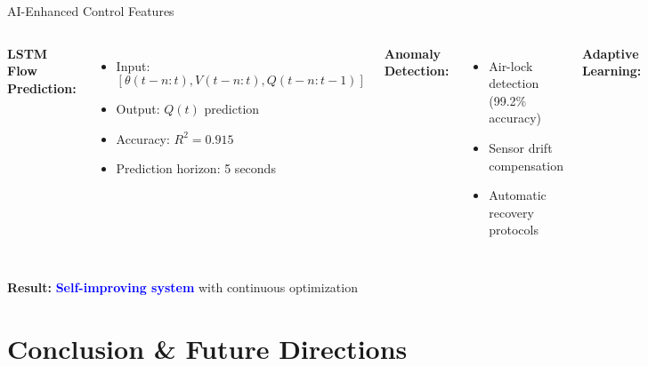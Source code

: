 \documentclass[aspectratio=169]{beamer}
\begin{document}
\begin{frame}{AI-Enhanced Control Features}
\begin{columns}[T]
\textbf{LSTM Flow Prediction:}
\begin{itemize}
    \item Input: $[\theta(t-n:t), V(t-n:t), Q(t-n:t-1)]$
    \item Output: $Q(t)$ prediction
    \item Accuracy: $R^2 = 0.915$
    \item Prediction horizon: 5 seconds
\end{itemize}

\textbf{Anomaly Detection:}
\begin{itemize}
    \item Air-lock detection (99.2\% accuracy)
    \item Sensor drift compensation
    \item Automatic recovery protocols
\end{itemize}

\textbf{Adaptive Learning:}
\begin{itemize}
    \item User pattern recognition
    \item Environmental adaptation
    \item Performance optimization
\end{itemize}

\begin{exampleblock}{Future AI Integration}
\textbf{Reinforcement Learning:}\\
Q-Learning for optimal control policies\\
\textbf{Computer Vision:}\\
Real-time liquid surface monitoring
\end{exampleblock}
\end{columns}

\vspace{1em}
\begin{center}
\textbf{Result:} \textcolor{blue}{\textbf{Self-improving system}} with continuous optimization
\end{center}
\end{frame}

\section{Conclusion \& Future Directions}
\end{document}
